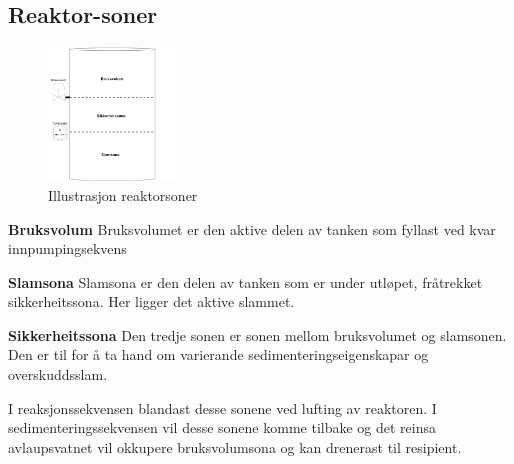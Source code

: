 \newpage
\subsection{Reaktor-soner}

\begin{figure}[htbp]
    \centering
    \includegraphics[width=0.3\textwidth]{Figurar/Reaktorsoner.png}
    \caption{Illustrasjon reaktorsoner}\label{fig:reaktorsoner}
\end{figure}

\textbf{Bruksvolum} \newline
Bruksvolumet er den aktive delen av tanken som fyllast ved kvar innpumpingsekvens

\textbf{Slamsona} \newline
Slamsona er den delen av tanken som er under utløpet, fråtrekket sikkerheitssona. Her ligger det aktive slammet.

\textbf{Sikkerheitssona} \newline
Den tredje sonen er sonen mellom bruksvolumet og slamsonen. Den er til for å ta hand om varierande sedimenteringseigenskapar og overskuddsslam.

I reaksjonssekvensen blandast desse sonene ved lufting av reaktoren. I sedimenteringssekvensen vil desse sonene komme tilbake og det reinsa avlaupsvatnet vil okkupere bruksvolumsona og kan drenerast til resipient.
